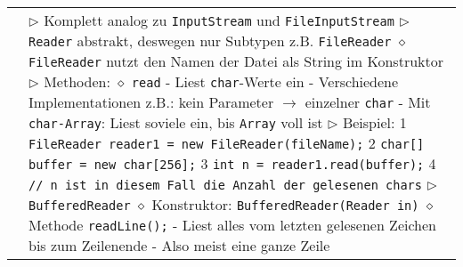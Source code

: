 \begin{longtable}{ | p{4cm} p{13.5cm} | }
	\makecell[l]{Textdaten lesen} & \makecell[l]{$\rhd$ Komplett analog zu \texttt{InputStream} und \texttt{FileInputStream} \\
	$\rhd$ \texttt{Reader} abstrakt, deswegen nur Subtypen z.B. \texttt{FileReader} \\
	\hspace{0.4cm} $\diamond$ \texttt{FileReader} nutzt den Namen der Datei als String im Konstruktor \\
	$\rhd$ Methoden: \\
	\hspace{0.4cm} $\diamond$ \texttt{read} \\
	\hspace{0.6cm} - Liest \texttt{char}-Werte ein \\
	\hspace{0.6cm} - Verschiedene Implementationen z.B.: kein Parameter $\rightarrow$ einzelner \texttt{char} \\
	\hspace{0.6cm} - Mit \texttt{char-Array}: Liest soviele ein, bis \texttt{Array} voll ist \\
	$\rhd$ Beispiel: \\
	\hspace{0.4cm} 1 \hspace{0.1cm} \texttt{FileReader reader1 = new FileReader(fileName);} \\
	\hspace{0.4cm} 2 \hspace{0.1cm} \texttt{char[] buffer = new char[256];} \\
	\hspace{0.4cm} 3 \hspace{0.1cm} \texttt{int n = reader1.read(buffer);} \\
	\hspace{0.4cm} 4 \hspace{0.1cm} \texttt{// n ist in diesem Fall die Anzahl der gelesenen chars} \\
	$\rhd$ \texttt{BufferedReader} \\
	\hspace{0.4cm} $\diamond$ Konstruktor: \texttt{BufferedReader(Reader in)} \\
	\hspace{0.4cm} $\diamond$ Methode \texttt{readLine();} \\
	\hspace{0.6cm} - Liest alles vom letzten gelesenen Zeichen bis zum Zeilenende \\
	\hspace{0.6cm} - Also meist eine ganze Zeile \\
}
\end{longtable}
